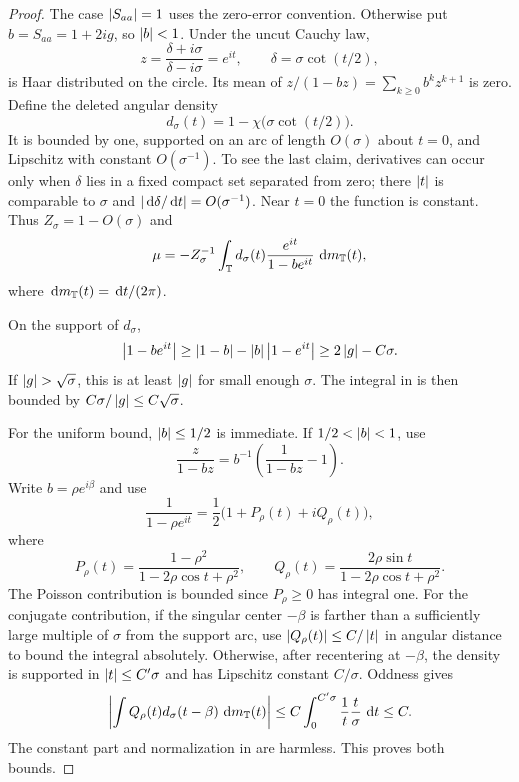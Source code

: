 \begin{proof}
The case $\left\lvert S_{aa}\right\rvert=1$ uses the zero-error convention. Otherwise put
$b=S_{aa}=1+2ig$, so $\left\lvert b\right\rvert<1$. Under the uncut Cauchy law,
\[
 z=\frac{\delta+i\sigma}{\delta-i\sigma}=e^{it},\qquad
 \delta=\sigma\cot(t/2),
\]
is Haar distributed on the circle. Its mean of
$z/(1-bz)=\sum_{k\ge0}b^kz^{k+1}$ is zero. Define the deleted angular
density
\[
 d_\sigma(t)=1-\chi\bigl(\sigma\cot(t/2)\bigr).
\]
It is bounded by one, supported on an arc of length $O(\sigma)$ about
$t=0$, and Lipschitz with constant $O(\sigma^{-1})$. To see the last
claim, derivatives can occur only when $\delta$ lies in a fixed compact
set separated from zero; there $\left\lvert t\right\rvert$ is comparable to $\sigma$ and
$\left\lvert\,\mathrm d\delta/\,\mathrm d t\right\rvert=O(\sigma^{-1})$. Near $t=0$ the function is
constant. Thus $Z_\sigma=1-O(\sigma)$ and
\begin{equation}
 \mu=-Z_\sigma^{-1}\int_\mathbb T
           d_\sigma(t)\frac{e^{it}}{1-be^{it}}\,\,\mathrm d m_\mathbb T(t),
 \label{mat:deleted-density}
\end{equation}
where $\,\mathrm d m_\mathbb T(t)=\,\mathrm d t/(2\pi)$.

On the support of $d_\sigma$,
\[
 \left\lvert1-be^{it}\right\rvert\ge\left\lvert1-b\right\rvert-\left\lvert b\right\rvert\left\lvert1-e^{it}\right\rvert
                    \ge 2\left\lvert g\right\rvert-C\sigma.
\]
If $\left\lvert g\right\rvert>\sqrt\sigma$, this is at least $\left\lvert g\right\rvert$ for small enough
$\sigma$. The integral in  is then bounded
by $C\sigma/\left\lvert g\right\rvert\le C\sqrt\sigma$.

For the uniform bound, $\left\lvert b\right\rvert\le1/2$ is immediate. If
$1/2<\left\lvert b\right\rvert<1$, use
\[
 \frac z{1-bz}=b^{-1}\left(\frac1{1-bz}-1\right).
\]
Write $b=\rho e^{i\beta}$ and use
\[
 \frac1{1-\rho e^{it}}
   =\frac12\bigl(1+P_\rho(t)+iQ_\rho(t)\bigr),
\]
where
\[
 P_\rho(t)=\frac{1-\rho^2}{1-2\rho\cos t+\rho^2},\qquad
 Q_\rho(t)=\frac{2\rho\sin t}{1-2\rho\cos t+\rho^2}.
\]
The Poisson contribution is bounded since $P_\rho\ge0$ has integral
one. For the conjugate contribution, if the singular center $-\beta$
is farther than a sufficiently large multiple of $\sigma$ from the
support arc, use $\left\lvert Q_\rho(t)\right\rvert\le C/\left\lvert t\right\rvert$ in angular distance to
bound the integral absolutely. Otherwise, after recentering at
$-\beta$, the density is supported in $\left\lvert t\right\rvert\le C'\sigma$ and has
Lipschitz constant $C/\sigma$. Oddness gives
\[
 \left\lvert\int Q_\rho(t)d_\sigma(t-\beta)\,\,\mathrm d m_\mathbb T(t)\right\rvert
 \le C\int_0^{C'\sigma}\frac1t\frac t\sigma\,\,\mathrm d t\le C.
\]
The constant part and normalization in
 are harmless. This proves both bounds.
\end{proof}

